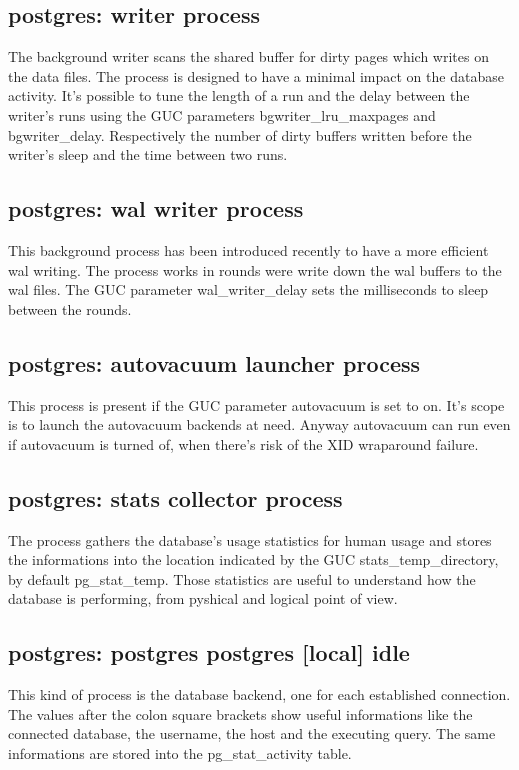 \subsection{postgres: writer process}
The background writer scans the shared buffer for dirty pages which writes on the data files. The
process is designed to have a minimal impact on the database activity. It's possible to tune the
length of a run and the delay between the writer's runs using the GUC parameters
bgwriter\_lru\_maxpages and bgwriter\_delay. Respectively the number of dirty buffers written before
the writer's sleep and the time between two runs.


\subsection{postgres: wal writer process}
This background process has been introduced recently to have a more efficient 
wal writing. The process works in rounds were write down the wal buffers to the 
wal files. The GUC parameter wal\_writer\_delay sets 
the milliseconds to sleep between the rounds. 

\subsection{postgres: autovacuum launcher process}
This process is present if the GUC parameter autovacuum is set to on.
It's scope is to launch the autovacuum backends at need.
Anyway autovacuum can run even if autovacuum is turned of, when there's risk 
of the XID wraparound failure.

\subsection{postgres: stats collector process}
The process gathers the database's usage statistics for human usage and stores 
the informations into the location indicated by the GUC stats\_temp\_directory, 
by default pg\_stat\_temp. Those statistics are useful to understand 
how the database is performing, from pyshical and logical point of view.

\subsection{postgres: postgres postgres [local] idle}
This kind of process is the database backend, one for each established 
connection. The values after the colon square brackets show useful 
informations like the connected database, the username, the host and the 
executing query. The same informations are stored into the pg\_stat\_activity 
table.


